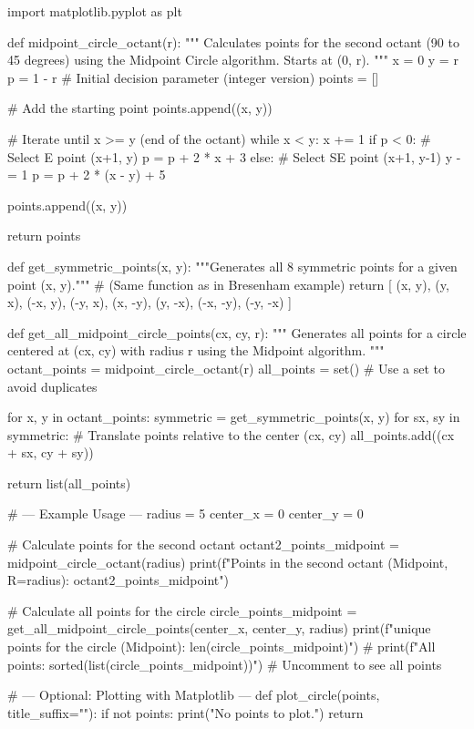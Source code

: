\documentclass[12pt, a4paper]{article}
\begin{document}
\begin{pythoncode}
import matplotlib.pyplot as plt

def midpoint_circle_octant(r):
    """
    Calculates points for the second octant (90 to 45 degrees)
    using the Midpoint Circle algorithm. Starts at (0, r).
    """
    x = 0
    y = r
    p = 1 - r  # Initial decision parameter (integer version)
    points = []

    # Add the starting point
    points.append((x, y))

    # Iterate until x >= y (end of the octant)
    while x < y:
        x += 1
        if p < 0:
            # Select E point (x+1, y)
            p = p + 2 * x + 3
        else:
            # Select SE point (x+1, y-1)
            y -= 1
            p = p + 2 * (x - y) + 5

        points.append((x, y))

    return points

def get_symmetric_points(x, y):
    """Generates all 8 symmetric points for a given point (x, y)."""
    # (Same function as in Bresenham example)
    return [
        (x, y), (y, x), (-x, y), (-y, x),
        (x, -y), (y, -x), (-x, -y), (-y, -x)
    ]

def get_all_midpoint_circle_points(cx, cy, r):
    """
    Generates all points for a circle centered at (cx, cy) with radius r
    using the Midpoint algorithm.
    """
    octant_points = midpoint_circle_octant(r)
    all_points = set() # Use a set to avoid duplicates

    for x, y in octant_points:
        symmetric = get_symmetric_points(x, y)
        for sx, sy in symmetric:
            # Translate points relative to the center (cx, cy)
            all_points.add((cx + sx, cy + sy))

    return list(all_points)

# --- Example Usage ---
radius = 5
center_x = 0
center_y = 0

# Calculate points for the second octant
octant2_points_midpoint = midpoint_circle_octant(radius)
print(f"Points in the second octant (Midpoint, R={radius}): {octant2_points_midpoint}")

# Calculate all points for the circle
circle_points_midpoint = get_all_midpoint_circle_points(center_x, center_y, radius)
print(f"\nTotal unique points for the circle (Midpoint): {len(circle_points_midpoint)}")
# print(f"All points: {sorted(list(circle_points_midpoint))}") # Uncomment to see all points

# --- Optional: Plotting with Matplotlib ---
def plot_circle(points, title_suffix=""):
    if not points:
        print("No points to plot.")
        return


\end{pythoncode}
\end{document}
